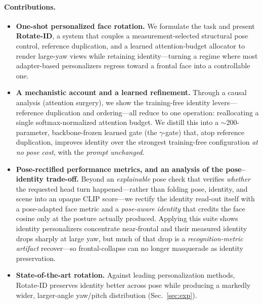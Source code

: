 \paragraph{Contributions.}
\begin{itemize}[leftmargin=1.2em,itemsep=2pt,topsep=2pt]
  \item \textbf{One-shot personalized face rotation.} We formulate the task and present \textbf{Rotate-ID}, a system that couples a measurement-selected structural pose control, reference duplication, and a learned attention-budget allocator to render large-yaw views while retaining identity---turning a regime where most adapter-based personalizers regress toward a frontal face into a controllable one.
  \item \textbf{A mechanistic account and a learned refinement.} Through a causal analysis (attention surgery), we show the training-free identity levers---reference duplication and ordering---all reduce to one operation: reallocating a single softmax-normalized attention budget. We distill this into a $\sim$200-parameter, backbone-frozen learned gate (the $\gamma$-gate) that, atop reference duplication, improves identity over the strongest training-free configuration \emph{at no pose cost}, with the \emph{prompt unchanged}.
  \item \textbf{Pose-rectified performance metrics, and an analysis of the pose--identity trade-off.} Beyond an \emph{explainable} pose check that verifies \emph{whether} the requested head turn happened---rather than folding pose, identity, and scene into an opaque CLIP score---we rectify the identity read-out itself with a pose-adapted face metric and a \emph{pose-aware identity} that credits the face cosine only at the posture actually produced. Applying this suite shows identity personalizers concentrate near-frontal and their measured identity drops sharply at large yaw, but much of that drop is a \emph{recognition-metric artifact} recover---so frontal-collapse can no longer masquerade as identity preservation.
  \item \textbf{State-of-the-art rotation.} Against leading personalization methods, Rotate-ID preserves identity better across pose while producing a
  markedly wider, larger-angle yaw/pitch distribution
  (Sec.~\ref{sec:exp}).
\end{itemize}
